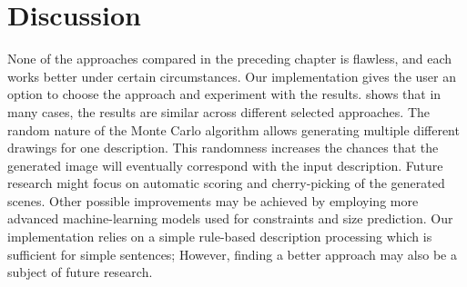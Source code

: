 \chapter{Discussion}

None of the approaches compared in the preceding chapter is flawless, and each works better under certain circumstances. Our implementation gives the user an option to choose the approach and experiment with the results.  shows that in many cases, the results are similar across different selected approaches. The random nature of the Monte Carlo algorithm allows generating multiple different drawings for one description. This randomness increases the chances that the generated image will eventually correspond with the input description. Future research might focus on automatic scoring and cherry-picking of the generated scenes. Other possible improvements may be achieved by employing more advanced machine-learning models used for constraints and size prediction. Our implementation relies on a simple rule-based description processing which is sufficient for simple sentences; However, finding a better approach may also be a subject of future research.

